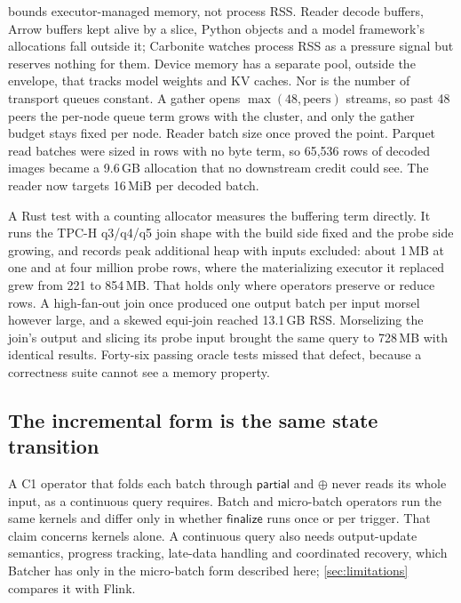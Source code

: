 \documentclass[10pt,twocolumn,letterpaper]{article}   %
\newcommand{\sys}{Batcher}
\newcommand{\carbo}{Carbonite}
\newcommand{\Ca}{\textsc{C1}}
\begin{document}
 bounds executor-managed memory, not process RSS. Reader decode buffers, Arrow
buffers kept alive by a slice, Python objects and a model framework's allocations fall outside
it; \carbo{} watches process RSS as a pressure signal but reserves nothing for them. Device
memory has a separate pool, outside the envelope, that tracks model weights and KV caches. Nor
is the number of transport queues constant. A gather opens $\max(48, \text{peers})$ streams,
so past 48 peers the per-node queue term grows with the cluster, and only the gather budget
stays fixed per node. Reader batch size once proved the point. Parquet read batches were sized
in rows with no byte term, so 65{,}536 rows of decoded images became a 9.6\,GB allocation that
no downstream credit could see. The reader now targets 16\,MiB per decoded batch.

A Rust test with a counting allocator measures the buffering term directly. It runs the
TPC-H q3/q4/q5 join shape with the build side fixed and the probe side growing, and records
peak additional heap with inputs excluded: about 1\,MB at one and at four million probe rows,
where the materializing executor it replaced grew from 221 to 854\,MB. That holds only where
operators preserve or reduce rows. A high-fan-out join once produced one output batch per
input morsel however large, and a skewed equi-join reached 13.1\,GB RSS. Morselizing the join's
output and slicing its probe input brought the same query to 728\,MB with identical results.
Forty-six passing oracle tests missed that defect, because a correctness suite cannot see a
memory property.

\subsection{The incremental form is the same state transition}
\label{sec:streaming}

A \Ca{} operator that folds each batch through $\mathsf{partial}$ and $\oplus$ never reads its
whole input, as a continuous query requires. Batch and micro-batch operators run the same
kernels and differ only in whether $\mathsf{finalize}$ runs once or per trigger. That claim
concerns kernels alone. A continuous query also needs output-update semantics, progress
tracking, late-data handling and coordinated recovery, which \sys{} has only in the
micro-batch form described here; \cref{sec:limitations} compares it with Flink.
\end{document}
